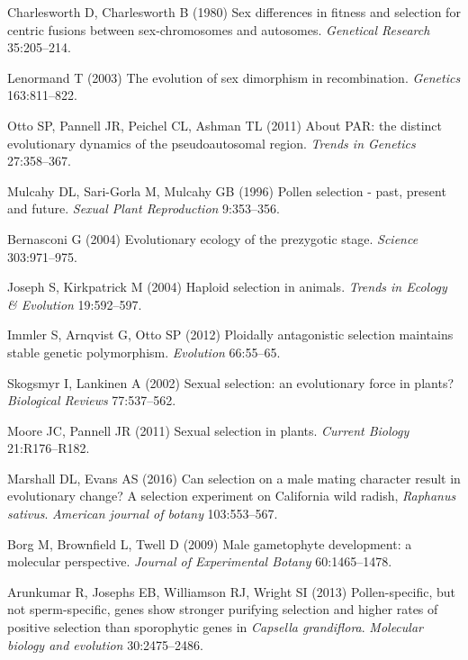 \begin{thebibliography}{20}
Charlesworth D, Charlesworth B
 (1980) {Sex differences in fitness and selection for centric fusions
  between sex-chromosomes and autosomes}.
 \textit{Genetical Research} 35:205--214.

Lenormand T
 (2003) {The evolution of sex dimorphism in recombination.}
 \textit{Genetics} 163:811--822.

Otto SP, Pannell JR, Peichel CL, Ashman TL
 (2011) {About PAR: the distinct evolutionary dynamics of the
  pseudoautosomal region}.
 \textit{Trends in Genetics} 27:358--367.

Mulcahy DL, Sari-Gorla M, Mulcahy GB
 (1996) {Pollen selection - past, present and future}.
 \textit{Sexual Plant Reproduction} 9:353--356.

Bernasconi G
 (2004) {Evolutionary ecology of the prezygotic stage}.
 \textit{Science} 303:971--975.

Joseph S, Kirkpatrick M
 (2004) {Haploid selection in animals}.
 \textit{Trends in Ecology {\&} Evolution} 19:592--597.

Immler S, Arnqvist G, Otto SP
 (2012) {Ploidally antagonistic selection maintains stable genetic
  polymorphism}.
 \textit{Evolution} 66:55--65.

Skogsmyr I, Lankinen A
 (2002) {Sexual selection: an evolutionary force in plants?}
 \textit{Biological Reviews} 77:537--562.

Moore JC, Pannell JR
 (2011) {Sexual selection in plants}.
 \textit{Current Biology} 21:R176--R182.

Marshall DL, Evans AS
 (2016) {Can selection on a male mating character result in
  evolutionary change? A selection experiment on California wild radish,
  \textit{Raphanus sativus}}.
 \textit{American journal of botany} 103:553--567.

Borg M, Brownfield L, Twell D
 (2009) {Male gametophyte development: a molecular perspective}.
 \textit{Journal of Experimental Botany} 60:1465--1478.

Arunkumar R, Josephs EB, Williamson RJ, Wright SI
 (2013) {Pollen-specific, but not sperm-specific, genes show stronger
  purifying selection and higher rates of positive selection than sporophytic
  genes in \textit{Capsella grandiflora}}.
 \textit{Molecular biology and evolution} 30:2475--2486.


\end{thebibliography}
